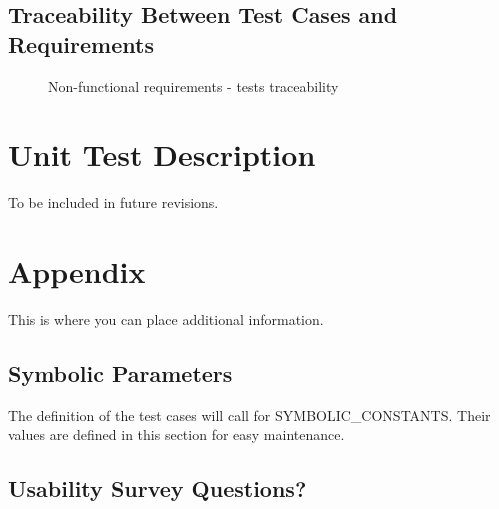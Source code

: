 \documentclass[12pt, titlepage]{article}
\begin{document}
\subsection{Traceability Between Test Cases and Requirements}


\begin{figure}[h!]
  \caption{Non-functional requirements - tests traceability}
  \label{fig:nfr}
\end{figure}
  
 

\section{Unit Test Description}
To be included in future revisions.





\newpage

\section{Appendix}

This is where you can place additional information.

\subsection{Symbolic Parameters}

The definition of the test cases will call for SYMBOLIC\_CONSTANTS.
Their values are defined in this section for easy maintenance.

\subsection{Usability Survey Questions?}

\end{document}
